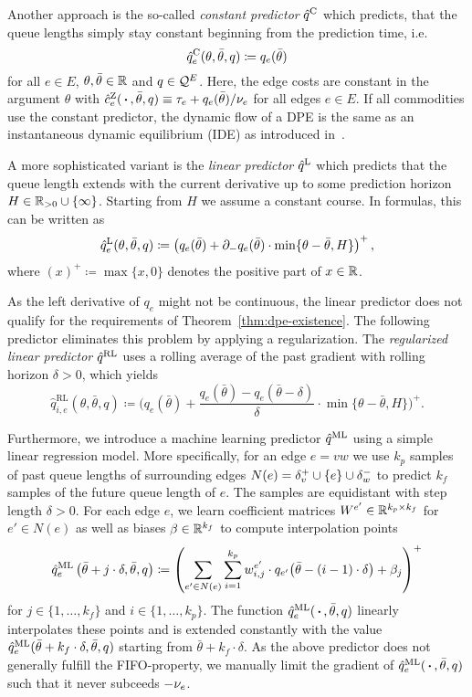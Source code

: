 Another approach is the so-called \emph{constant predictor} $\hat q^{\text{C}}$ which predicts, that the queue lengths simply stay constant beginning from the prediction time, i.e.
\[
    \hat q^{\text{C}}_{e}(\theta, \bar\theta, q) \coloneqq q_e(\bar\theta)
\]
for all $e\in E$, $\theta,\bar\theta\in\mathbb{R}$ and $q\in \mathcal{Q}^E$.
Here, the edge costs are constant in the argument $\theta$ with $\hat c^{\text{Z}}_e(\,\boldsymbol{\cdot}\,, \bar\theta, q)\equiv \tau_e + q_e(\bar\theta)/\nu_e$ for all edges $e\in E$.
If all commodities use the constant predictor, the dynamic flow of a DPE is the same as an instantaneous dynamic equilibrium (IDE) as introduced in~\cite[Definition~2.1]{Graf2020}.

A more sophisticated variant is the \emph{linear predictor} $\hat q^{\text{L}}$ which predicts that the queue length extends with the current derivative up to some prediction horizon $H\in \mathbb{R}_{>0} \cup \{ \infty \}$.
Starting from $H$ we assume a constant course.
In formulas, this can be written as \[
    \hat q^{\text{L}}_e(\theta,\bar\theta,q) \coloneqq \left( q_e(\bar\theta) + \partial_- q_e(\bar\theta) \cdot \min\{\theta - \bar\theta, H \} \right)^+,
\]
where $(x)^+\coloneqq \max\{ x, 0 \}$ denotes the positive part of $x\in\mathbb{R}$.

As the left derivative of $q_e$ might not be continuous, the linear predictor does not qualify for the requirements of Theorem~\ref{thm:dpe-existence}.
The following predictor eliminates this problem by applying a regularization.
The \emph{regularized linear predictor} $\hat q^{\text{RL}}$ uses a rolling average of the past gradient with rolling horizon $\delta>0$, which yields
\[
\hat q_{i,e}^{\text{RL}}(\theta, \bar\theta, q) \coloneqq
  \Big( q_e(\bar\theta) + \frac{q_e(\bar\theta) - q_e(\bar\theta - \delta)}{\delta} \cdot \min\{ \theta - \bar\theta, H \} \Big)^+.
\]

Furthermore, we introduce a machine learning predictor $\hat q^{\text{ML}}$ using a simple linear regression model.
More specifically, for an edge $e=vw$ we use $k_p$ samples of past queue lengths of surrounding edges $N(e) = \delta^+_{v} \cup \{ e \} \cup\delta^-_{w}$ to predict $k_f$ samples of the future queue length of $e$.
The samples are equidistant with step length $\delta > 0$.
For each edge $e$, we learn coefficient matrices $W^{e'}\in\mathbb{R}^{k_p\times k_f}$ for $e'\in N(e)$ as well as biases $\beta\in\mathbb{R}^{k_f}$ to compute interpolation points \[
    \hat q^{\text{ML}}_e\left(\bar\theta + j\cdot\delta,\bar\theta,q \right) \coloneqq 
    \left(
    \sum_{e'\in N(e)} \sum_{i = 1}^{k_p} w^{e'}_{i, j} \cdot {q_{e'}}{\left( 
        \bar\theta - (i-1)\cdot\delta
    \right)}
    + \beta_j
    \right)^+
\]
for $j\in\{1,\dots,k_f\}$ and $i\in\{1,\dots,k_p\}$.
The function $\hat q^{\text{ML}}_e(\,\boldsymbol{\cdot}\,, \bar\theta, q)$ linearly interpolates these points and is extended constantly with the value $\hat q^{\text{ML}}_e(\bar\theta + k_f\cdot\delta,\bar\theta,q )$ starting from $\bar\theta + k_f\cdot \delta$.
As the above predictor does not generally fulfill the FIFO-property, we manually limit the gradient of $\hat q^{\text{ML}}_e(\,\boldsymbol{\cdot}\,, \bar\theta, q)$ such that it never subceeds $-\nu_e$.

